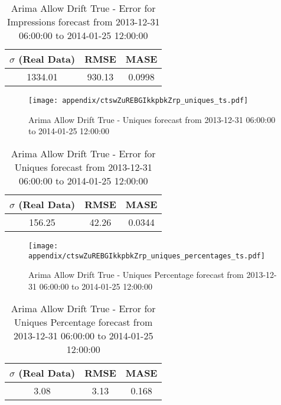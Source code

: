 \begin{table}[H]
\centering
\footnotesize
\begin{tabular}{ccc}
$\sigma$ (Real Data) & RMSE & MASE   \\ \hline
1334.01 & 930.13 & 0.0998 \\
\end{tabular}

\vspace{0.5cm}

\caption{
Arima Allow Drift True - Error for Impressions forecast from 2013-12-31 06:00:00 to 2014-01-25 12:00:00}
\end{table}

\begin{figure}[H] \begin{center} \leavevmode
\texttt{[image: appendix/ctswZuREBGIkkpbkZrp\_uniques\_ts.pdf]} \caption{
Arima Allow Drift True - Uniques forecast from 2013-12-31 06:00:00 to 2014-01-25 12:00:00} \label{fig:appendix/ctswZuREBGIkkpbkZrp_uniques_ts.pdf} \end{center}
\end{figure}

\begin{table}[H]
\centering
\footnotesize
\begin{tabular}{ccc}
$\sigma$ (Real Data) & RMSE & MASE   \\ \hline
156.25 & 42.26 & 0.0344 \\
\end{tabular}

\vspace{0.5cm}

\caption{
Arima Allow Drift True - Error for Uniques forecast from 2013-12-31 06:00:00 to 2014-01-25 12:00:00}
\end{table}

\begin{figure}[H] \begin{center} \leavevmode
\texttt{[image: appendix/ctswZuREBGIkkpbkZrp\_uniques\_percentages\_ts.pdf]} \caption{
Arima Allow Drift True - Uniques Percentage forecast from 2013-12-31 06:00:00 to 2014-01-25 12:00:00} \label{fig:appendix/ctswZuREBGIkkpbkZrp_uniques_percentages_ts.pdf} \end{center}
\end{figure}

\begin{table}[H]
\centering
\footnotesize
\begin{tabular}{ccc}
$\sigma$ (Real Data) & RMSE & MASE   \\ \hline
3.08 & 3.13 & 0.168 \\
\end{tabular}

\vspace{0.5cm}

\caption{
Arima Allow Drift True - Error for Uniques Percentage forecast from 2013-12-31 06:00:00 to 2014-01-25 12:00:00}
\end{table}

